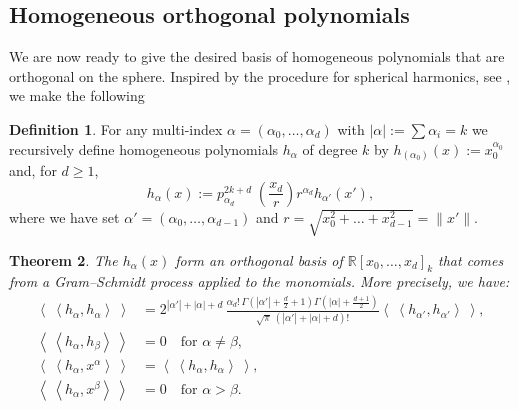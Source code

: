 \documentclass{amsart}
\newcommand{\p}[2]{p_{#1}^{#2}\;\!\!}
\newcommand{\coloneqq}{:=}
\newcommand{\bra}{\left<\!\!\!\:\left<}
\newcommand{\ket}{\right>\!\!\!\:\right>}
\newcommand{\R}{\mathbb{R}}
\theoremstyle{plain}
\newtheorem{theorem}{Theorem}[section]
\theoremstyle{definition}
\newtheorem{definition}[theorem]{Definition}
\theoremstyle{remark}
\begin{document}
\subsection{Homogeneous orthogonal polynomials} 
We are now ready to give the desired basis of homogeneous polynomials that are orthogonal on the sphere. Inspired by the procedure for spherical harmonics, see \cite[p.~35]{Dunkl}, we make the following
\begin{definition} \label{hdef}
For any multi-index $\alpha=(\alpha_0,\ldots,\alpha_d)$ with $|\alpha |\coloneqq\sum\alpha_i = k$ we recursively define homogeneous polynomials $h_\alpha$ of degree $k$ by  $h_{(\alpha_0)}(x) \coloneqq x_0^{\alpha_0}$ and, for $d\geq 1$,
$$
h_\alpha(x) \coloneqq \p{\alpha_d}{2k+d}\left(\frac{x_d}{r}\right) r^{\alpha_d}h_{\alpha'}(x'),
$$
where we have set $\alpha'=(\alpha_0,\ldots,\alpha_{d-1})$ and $r=\sqrt{x_0^2 +\ldots+x_{d-1}^2}=\|x'\|$.
\end{definition}
\begin{theorem}
The $h_\alpha(x)$ form an orthogonal basis of $\R[x_0,\ldots,x_d]_k$ that comes from a Gram--Schmidt process applied to the monomials. More precisely, we have:
\begin{align} \label{hth1}
\bra h_\alpha ,h_\alpha \ket &= 2^{|\alpha '|+|\alpha |+d}\,
\frac{\alpha_d!\,\Gamma\!\left(|\alpha '|+\frac{d}{2}+1\right)\Gamma\!\left(|\alpha |+\frac{d+1}{2}\right)}{\sqrt{\pi}\,\left(|\alpha '|+|\alpha |+d\right)!}\bra h_{\alpha '},h_{\alpha '}\ket ,\\
\label{hth2}
\bra h_\alpha,h_\beta \ket &= 0 \quad\text{for }\alpha\neq\beta,\\
\bra h_\alpha, x^\alpha \ket &= \bra h_\alpha ,h_\alpha \ket ,\\
\bra h_\alpha,x^\beta \ket &= 0 \quad\text{for }\alpha > \beta.
\end{align}

\end{theorem}
\end{document}
